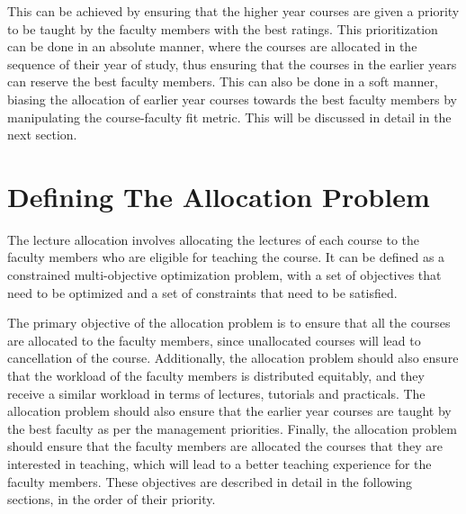 This can be achieved by ensuring that the higher year courses are given a priority to be taught by the faculty members with the best ratings. This prioritization can be done in an absolute manner, where the courses are allocated in the sequence of their year of study, thus ensuring that the courses in the earlier years can reserve the best faculty members. This can also be done in a soft manner, biasing the allocation of earlier year courses towards the best faculty members by manipulating the course-faculty fit metric. This will be discussed in detail in the next section.

\section{Defining The Allocation Problem}
\label{sec:defining_the_allocation_problem}

The lecture allocation involves allocating the lectures of each course to the faculty members who are eligible for teaching the course. It can be defined as a constrained multi-objective optimization problem, with a set of objectives that need to be optimized and a set of constraints that need to be satisfied.

The primary objective of the allocation problem is to ensure that all the courses are allocated to the faculty members, since unallocated courses will lead to cancellation of the course. Additionally, the allocation problem should also ensure that the workload of the faculty members is distributed equitably, and they receive a similar workload in terms of lectures, tutorials and practicals. The allocation problem should also ensure that the earlier year courses are taught by the best faculty as per the management priorities. Finally, the allocation problem should ensure that the faculty members are allocated the courses that they are interested in teaching, which will lead to a better teaching experience for the faculty members. These objectives are described in detail in the following sections, in the order of their priority.

